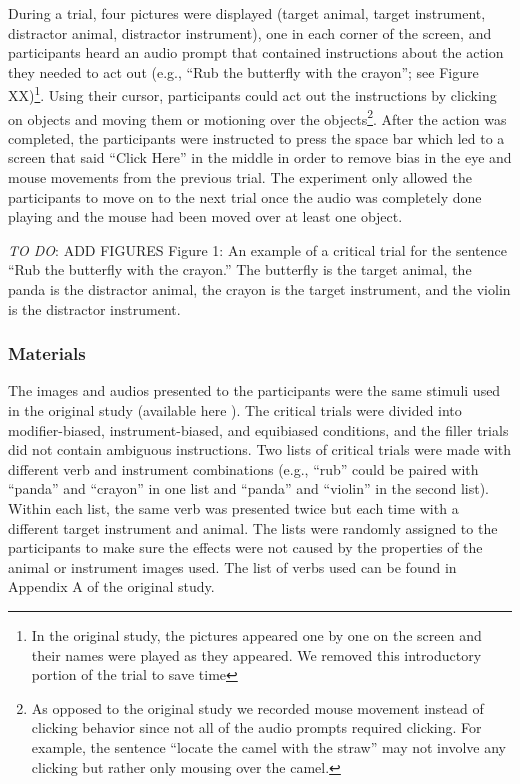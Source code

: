 \documentclass[
  english,
  man,floatsintext]{apa6}
\begin{document}
During a trial, four pictures were displayed (target animal, target instrument, distractor animal, distractor instrument), one in each corner of the screen, and participants heard an audio prompt that contained instructions about the action they needed to act out (e.g., ``Rub the butterfly with the crayon''; see Figure XX)\footnote{In the original study, the pictures appeared one by one on the screen and their names were played as they appeared. We removed this introductory portion of the trial to save time}. Using their cursor, participants could act out the instructions by clicking on objects and moving them or motioning over the objects\footnote{ As opposed to the original study we recorded mouse movement instead of clicking behavior since not all of the audio prompts required clicking. For example, the sentence ``locate the camel with the straw'' may not involve any clicking but rather only mousing over the camel.}. After the action was completed, the participants were instructed to press the space bar which led to a screen that said ``Click Here'' in the middle in order to remove bias in the eye and mouse movements from the previous trial. The experiment only allowed the participants to move on to the next trial once the audio was completely done playing and the mouse had been moved over at least one object.

\emph{TO DO}: ADD FIGURES Figure 1: An example of a critical trial for the sentence ``Rub the butterfly with the crayon.'' The butterfly is the target animal, the panda is the distractor animal, the crayon is the target instrument, and the violin is the distractor instrument.

\hypertarget{materials-1}{%
\subsubsection{Materials}\label{materials-1}}

The images and audios presented to the participants were the same stimuli used in the original study (available here ). The critical trials were divided into modifier-biased, instrument-biased, and equibiased conditions, and the filler trials did not contain ambiguous instructions. Two lists of critical trials were made with different verb and instrument combinations (e.g., ``rub'' could be paired with ``panda'' and ``crayon'' in one list and ``panda'' and ``violin'' in the second list). Within each list, the same verb was presented twice but each time with a different target instrument and animal. The lists were randomly assigned to the participants to make sure the effects were not caused by the properties of the animal or instrument images used. The list of verbs used can be found in Appendix A of the original study.
\end{document}
